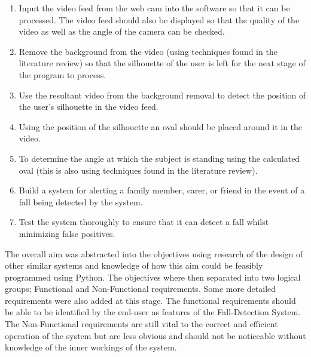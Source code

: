 \documentclass[11pt,a4paper]{report}
\begin{document}
\begin{enumerate}
	\item Input the video feed from the web cam into the software so that it can be processed. The video feed should also be displayed so that the quality of the video as well as the angle of the camera can be checked.
    \item Remove the background from the video (using techniques found in the literature review) so that the silhouette of the user is left for the next stage of the program to process.
    \item Use the resultant video from the background removal to detect the position of the user’s silhouette in the video feed.
    \item Using the position of the silhouette an oval should be placed around it in the video.
    \item To determine the angle at which the subject is standing using the calculated oval (this is also using
techniques found in the literature review).
	\item Build a system for alerting a family member, carer, or friend in the event of a fall being detected by the
system.
	\item Test the system thoroughly to ensure that it can detect a fall whilst minimizing false positives.
\end{enumerate}

The overall aim was abstracted into the objectives using research of the design of other similar systems and knowledge of how this aim could be feasibly programmed using Python. The objectives where then separated into two logical groups; Functional and Non-Functional requirements. Some more detailed requirements were also added at this stage. The functional requirements should be able to be identified by the end-user as features of the Fall-Detection System. The Non-Functional requirements are still vital to the correct and efficient operation of the system but are less obvious and should not be noticeable without knowledge of the inner workings of the system.   
\end{document}
